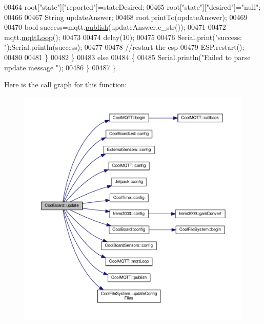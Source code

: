 \begin{DoxyCode}
00464             root[\textcolor{stringliteral}{"state"}][\textcolor{stringliteral}{"reported"}]=stateDesired;
00465             root[\textcolor{stringliteral}{"state"}][\textcolor{stringliteral}{"desired"}]=\textcolor{stringliteral}{"null"};
00466             
00467             String updateAnswer;
00468             root.printTo(updateAnswer);
00469 
00470             \textcolor{keywordtype}{bool} success=mqtt.\hyperlink{class_cool_m_q_t_t_ace977b3e90ab14b1199fe5c4fb0a13ec}{publish}(updateAnswer.c\_str());
00471             
00472             mqtt.\hyperlink{class_cool_m_q_t_t_aa5eaae967b562b62cbcf2b8d81f6e5d5}{mqttLoop}();
00473 
00474             delay(10);
00475 
00476             Serial.print(\textcolor{stringliteral}{"success: "});Serial.println(success);
00477             
00478             \textcolor{comment}{//restart the esp}
00479             ESP.restart();
00480                 
00481         \}
00482     \}
00483     \textcolor{keywordflow}{else}
00484     \{
00485         Serial.println(\textcolor{stringliteral}{"Failed to parse update message "});  
00486     \}       
00487 \}
\end{DoxyCode}
Here is the call graph for this function\+:
\nopagebreak
\begin{figure}[H]
\begin{center}
\leavevmode
\includegraphics[width=350pt]{class_cool_board_a8612756d3f73198cdde857a66f0fe690_cgraph}
\end{center}
\end{figure}
